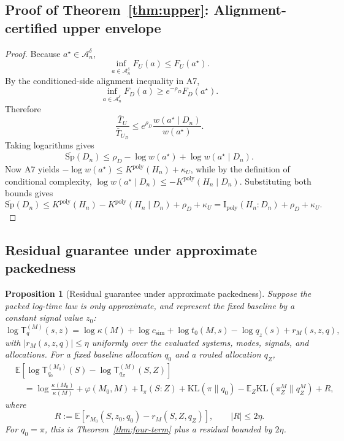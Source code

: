 \documentclass[10pt]{article}
\theoremstyle{paperplain}
\newtheorem{proposition}[theorem]{Proposition}
\theoremstyle{paperdefinition}
\theoremstyle{paperremark}
\newcommand{\poly}{\mathrm{poly}}
\newcommand{\KL}{\mathrm{KL}}
\newcommand{\I}{\mathrm{I}}
\newcommand{\E}{\mathbb{E}}
\newcommand{\cA}{\mathcal{A}}
\newcommand{\Sp}{\mathrm{Sp}}
\begin{document}
\subsection{Proof of Theorem~\ref{thm:upper}: Alignment-certified upper envelope}
\label{app:proof:thm:upper}

\begin{proof}
Because $a^\star\in\cA_n^\delta$,
\[
\inf_{a\in\cA_n^\delta}F_U(a)\le F_U(a^\star).
\]
By the conditioned-side alignment inequality in A7,
\[
\inf_{a\in\cA_n^\delta}F_D(a)\ge e^{-\rho_D}F_D(a^\star).
\]
Therefore
\[
\frac{\overline T_U}{\overline T_{U_D}}
\le
e^{\rho_D}\frac{w(a^\star\mid D_n)}{w(a^\star)}.
\]
Taking logarithms gives
\[
\overline{\Sp}(D_n)
\le
\rho_D-\log w(a^\star)+\log w(a^\star\mid D_n).
\]
Now A7 yields
$-\log w(a^\star)\le K^{\poly}(H_n)+\kappa_U$,
while by the definition of conditional complexity,
$\log w(a^\star\mid D_n)\le -K^{\poly}(H_n\mid D_n)$.
Substituting both bounds gives
\[
\overline{\Sp}(D_n)
\le
K^{\poly}(H_n)-K^{\poly}(H_n\mid D_n)+\rho_D+\kappa_U
=
\I_{\mathrm{poly}}(H_n:D_n)+\rho_D+\kappa_U.
\]
\end{proof}

\subsection{Residual guarantee under approximate packedness}
\label{app:proof:prop:approximation-guarantee}

\begin{proposition}[Residual guarantee under approximate packedness]
\label{prop:approximation-guarantee}
Suppose the packed log-time law is only approximate, and represent the fixed baseline by a constant signal value $z_0$:
\[
\log \mathsf{T}_{q}^{(M)}(s,z)
=\log\kappa(M)+\log c_{\mathrm{sim}}+\log t_0(M,s)-\log q_z(s)
+r_M(s,z,q),
\]
with $|r_M(s,z,q)|\le\eta$ uniformly over the evaluated systems, modes, signals, and allocations.
For a fixed baseline allocation $q_0$ and a routed allocation $q_Z$,
\[
\begin{aligned}
&\E\!\left[\log \mathsf{T}_{q_0}^{(M_0)}(S)-\log \mathsf{T}_{q_Z}^{(M)}(S,Z)\right]\\
&\quad=
\log\frac{\kappa(M_0)}{\kappa(M)}
+\varphi(M_0,M)+\I_\pi(S:Z)
+\KL(\pi\|q_0)-\E_Z\KL(\pi_Z^M\|q_Z^M)+R,
\end{aligned}
\]
where
\[
R:=\E[r_{M_0}(S,z_0,q_0)-r_M(S,Z,q_Z)],
\qquad |R|\le 2\eta.
\]
For $q_0=\pi$, this is Theorem~\ref{thm:four-term} plus a residual bounded by $2\eta$.
\end{proposition}
\end{document}
